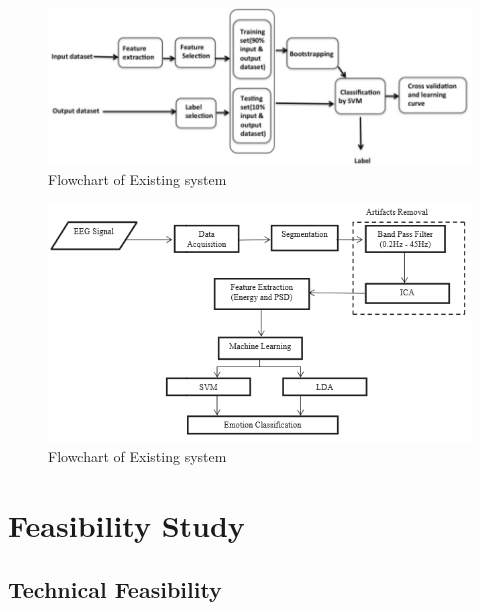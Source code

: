 \documentclass[a4paper, 12pt, oneside]{uet_thesis}
\begin{document}
\begin{figure}[htbp]
\centerline{\includegraphics[scale=0.7]{Existing2.png}}
\caption{Flowchart of Existing system  \cite{b15} }
\label{Table4}
\end{figure}
\newpage
\begin{figure}[htbp]
\centerline{\includegraphics[scale=0.8]{Existing3.png}}
\caption{Flowchart of Existing system  \cite{b18}}
\label{Table4}
\end{figure}



\newpage
\chapter{Feasibility Study}
\section{Technical Feasibility}
\end{document}
